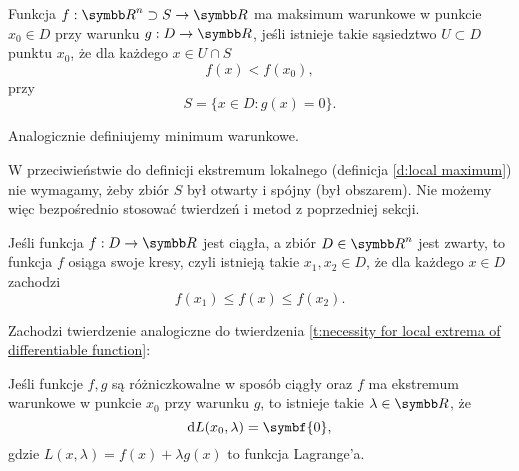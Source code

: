\begin{definition}
    Funkcja $f : \RR^n \supset S \to \RR$ ma maksimum warunkowe w punkcie $x_0 \in D$ przy warunku $g : D \to \RR$, jeśli istnieje takie sąsiedztwo $U \subset D$ punktu $x_0$, że dla każdego $x \in U \cap S$
    \[ f(x) < f(x_0), \]
    przy
    \[ S = \{x \in D : g(x) = 0\}. \]
\end{definition}

Analogicznie definiujemy minimum warunkowe.

\begin{remark*}
    W przeciwieństwie do definicji ekstremum lokalnego (definicja \ref{d:local maximum}) nie wymagamy, żeby zbiór $S$ był otwarty i spójny (był obszarem). Nie możemy więc bezpośrednio stosować twierdzeń i metod z poprzedniej sekcji.
\end{remark*}

\begin{theorem}
    \label{t:Weierstrass}
    Jeśli funkcja $f : D \to \RR$ jest ciągła, a zbiór $D \in \RR^n$ jest zwarty, to funkcja $f$ osiąga swoje kresy, czyli istnieją takie $x_1, x_2 \in D$, że dla każdego $x \in D$ zachodzi
    \[ f(x_1) \leq f(x) \leq f(x_2). \]
\end{theorem}

Zachodzi twierdzenie analogiczne do twierdzenia \ref{t:necessity for local extrema of differentiable function}:

\begin{theorem}
    \label{t:necessity for conditional extrema of differentiable function}
    Jeśli funkcje $f, g$ są różniczkowalne w sposób ciągły oraz $f$ ma ekstremum warunkowe w punkcie $x_0$ przy warunku $g$, to istnieje takie $\lambda \in \RR$, że
    \[ \d L(x_0, \lambda) = \symbf{0}, \]
    gdzie $L(x, \lambda) = f(x) + \lambda g(x)$ to funkcja Lagrange'a.
\end{theorem}

